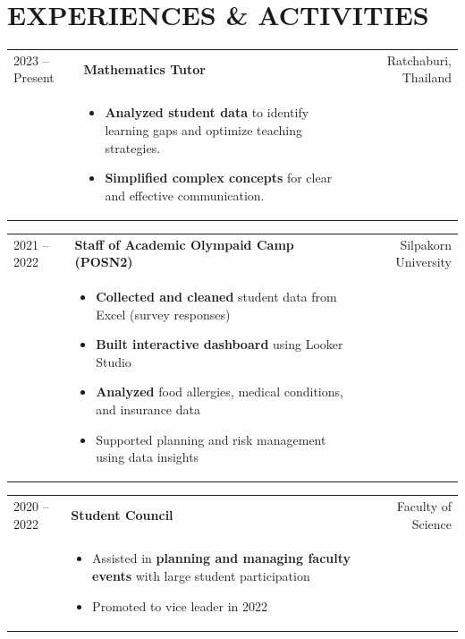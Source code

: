 \documentclass[11pt,a4paper]{article}
\begin{document}

\section*{EXPERIENCES \& ACTIVITIES}

\begin{tabularx}{\textwidth}{l X r}
2023 -- Present & 
\textbf{Mathematics Tutor} & 
\small{Ratchaburi, Thailand} \\

& \begin{itemize}[leftmargin=*, nosep, after=\vspace{-\baselineskip}]
    \item \textbf{Analyzed student data} to identify learning gaps and optimize teaching strategies.
    \item \textbf{Simplified complex concepts} for clear and effective communication.
\end{itemize} & 
\end{tabularx}

\vspace{0.3cm}

\begin{tabularx}{\textwidth}{l X r}
2021 -- 2022 & 
\textbf{Staff of Academic Olympaid Camp (POSN2)} & 
\small{Silpakorn University} \\
&
\begin{itemize}
        \item \textbf{Collected and cleaned} student data from Excel (survey responses)
        \item \textbf{Built interactive dashboard} using Looker Studio
        \item \textbf{Analyzed} food allergies, medical conditions, and insurance data
        \item Supported planning and risk management using data insights
    \end{itemize}
\end{tabularx}

\begin{tabularx}{\textwidth}{l X r}
2020 -- 2022 &
\textbf{Student Council} &
\small{Faculty of Science} \\
&
\begin{itemize}
    \item Assisted in \textbf{planning and managing faculty events} with large student participation
    \item Promoted to vice leader in 2022
\end{itemize}
\end{tabularx}
\end{document}
